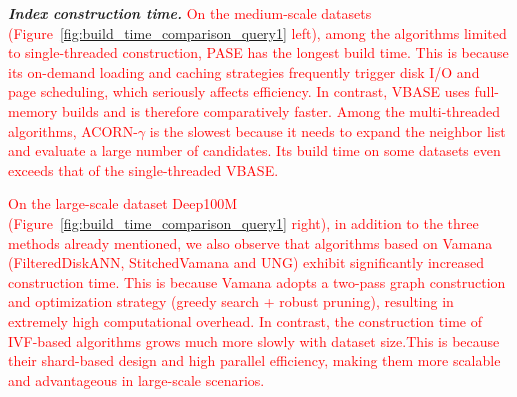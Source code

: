 \documentclass[sigconf, nonacm]{acmart}
\begin{document}
{\textit{\textbf{Index construction time.}}
\textcolor{red}{On the medium-scale datasets (Figure~\ref{fig:build_time_comparison_query1} left), among the algorithms limited to single-threaded construction, PASE has the longest build time. This is because its on-demand loading and caching strategies frequently trigger disk I/O and page scheduling, which seriously affects efficiency. In contrast, VBASE uses full-memory builds and is therefore comparatively faster. Among the multi-threaded algorithms, ACORN-$\gamma$ is the slowest because it needs to expand the neighbor list and evaluate a large number of candidates. Its build time on some datasets even exceeds that of the single-threaded VBASE. }

\textcolor{red}{On the large-scale dataset Deep100M (Figure~\ref{fig:build_time_comparison_query1} right), in addition to the three methods already mentioned, we also observe that algorithms based on Vamana (FilteredDiskANN, StitchedVamana and UNG) exhibit significantly increased construction time. This is because Vamana adopts a two-pass graph construction and optimization strategy (greedy search + robust pruning), resulting in extremely high computational overhead. In contrast, the construction time of IVF-based algorithms grows much more slowly with dataset size.This is because their shard-based design and high parallel efficiency, making them more scalable and advantageous in large-scale scenarios.}


}
\end{document}
